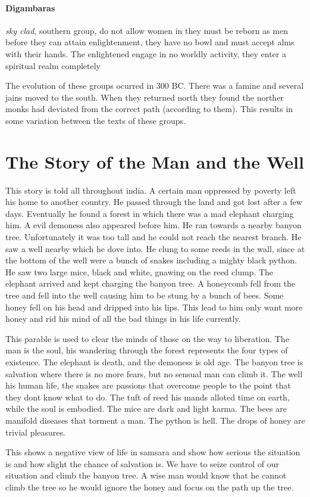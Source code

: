 \documentclass{article}
\begin{document}
\paragraph{Digambaras}
\label{par:digambaras}
\emph{sky clad}, southern group, do not allow women in they must be reborn as men before they can attain enlightenment, they have no bowl and must accept alms with their hands. The enlightened engage in no worldly activity, they enter a spiritual realm completely

The evolution of these groups ocurred in 300 BC. There was a famine and several jains moved to the south. When they returned north they found the norther monks had deviated from the correct path (according to them). This results in some variation between the texts of these groups.

\section*{The Story of the Man and the Well}
\label{sec:the_story_of_the_man_and_the_well}
This story is told all throughout india. A certain man oppressed by poverty left his home to another country. He passed through the land and got lost after a few days. Eventually he found a forest in which there was a mad elephant charging him. A evil demoness also appeared before him. He ran towards a nearby banyon tree. Unfortunately it was too tall and he could not reach the nearest branch. He saw a well nearby which he dove into. He clung to some reeds in the wall, since at the bottom of the well were a bunch of snakes including a mighty black python. He saw two large mice, black and white, gnawing on the reed clump. The elephant arrived and kept charging the banyon tree. A honeycomb fell from the tree and fell into the well causing him to be stung by a bunch of bees. Some honey fell on his head and dripped into his lips. This lead to him only want more honey and rid his mind of all the bad things in his life currently.

This parable is used to clear the minds of those on the way to liberation. The man is the soul, his wandering through the forest represents the four types of existence. The elephant is death, and the demoness is old age. The banyon tree is salvation where there is no more fears, but no sensual man can climb it. The well his human life, the snakes are passions that overcome people to the point that they dont know what to do. The tuft of reed his mands alloted time on earth, while the soul is embodied. The mice are dark and light karma. The bees are manifold diseases that torment a man. The python is hell. The drops of honey are trivial pleasures.

This shows a negative view of life in samsara and show how serious the situation is and how slight the chance of salvation is. We have to seize control of our situation and climb the banyon tree. A wise man would know that he cannot climb the tree so he would ignore the honey and focus on the path up the tree.
\end{document}
